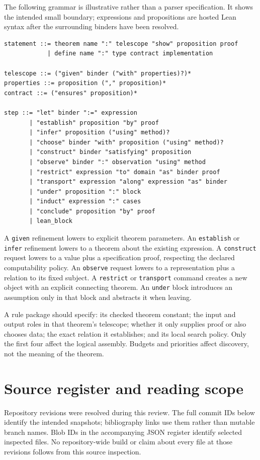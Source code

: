\documentclass[11pt,letterpaper]{article}
\newcommand{\code}[1]{\nolinkurl{#1}}
\theoremstyle{remark}
\begin{document}
The following grammar is illustrative rather than a parser specification.
It shows the intended small boundary; expressions and propositions are hosted
Lean syntax after the surrounding binders have been resolved.
\begin{lstlisting}
statement ::= theorem name ":" telescope "show" proposition proof
            | define name ":" type contract implementation

telescope ::= ("given" binder ("with" properties)?)*
properties ::= proposition ("," proposition)*
contract ::= ("ensures" proposition)*

step ::= "let" binder ":=" expression
       | "establish" proposition "by" proof
       | "infer" proposition ("using" method)?
       | "choose" binder "with" proposition ("using" method)?
       | "construct" binder "satisfying" proposition
       | "observe" binder ":" observation "using" method
       | "restrict" expression "to" domain "as" binder proof
       | "transport" expression "along" expression "as" binder
       | "under" proposition ":" block
       | "induct" expression ":" cases
       | "conclude" proposition "by" proof
       | lean_block
\end{lstlisting}

A \code{given} refinement lowers to explicit theorem parameters. An
\code{establish} or \code{infer} refinement lowers to a theorem about the
existing expression. A \code{construct} request lowers to a value plus a
specification proof, respecting the declared computability policy. An
\code{observe} request lowers to a representation plus a relation to its
fixed subject. A \code{restrict} or \code{transport} command creates a new
object with an explicit connecting theorem. An \code{under} block introduces
an assumption only in that block and abstracts it when leaving.

A rule package should specify: its checked theorem constant; the input and
output roles in that theorem's telescope; whether it only supplies proof or
also chooses data; the exact relation it establishes; and its local search
policy. Only the first four affect the logical assembly. Budgets and priorities
affect discovery, not the meaning of the theorem.

\section{Source register and reading scope}\label{app:sources}

Repository revisions were resolved during this review. The full commit IDs
below identify the intended snapshots; bibliography links use them rather
than mutable branch names. Blob IDs in the accompanying JSON register identify
selected inspected files. No repository-wide build or claim about every file
at those revisions follows from this source inspection.
\end{document}
